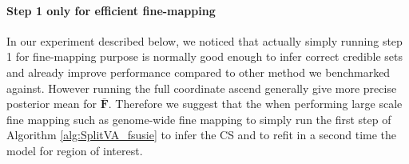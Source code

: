 \paragraph{Step 1 only for efficient fine-mapping}

In our experiment described below, we noticed that actually simply running step 1 for fine-mapping purpose is normally good enough to infer  correct credible sets and already improve performance compared to other method we benchmarked against. However running the full coordinate ascend generally give more precise posterior mean for $\bar{\bm{F}}$. Therefore we suggest that the when performing large scale fine mapping such as genome-wide fine mapping to simply run the first step of Algorithm \ref{alg:SplitVA_fsusie} to infer the CS and to refit in a second time the model for region of interest.


 

